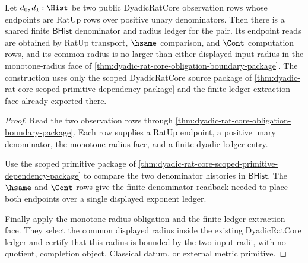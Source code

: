 \begin{theorem}
\label{thm:dyadic-common-exponent-radius-monotone}
Let $d_0,d_1:\Hist$ be two public DyadicRatCore observation rows whose
endpoints are RatUp rows over positive unary denominators. Then there is a
shared finite $\mathsf{BHist}$ denominator and radius ledger for the pair. Its
endpoint reads are obtained by RatUp transport, $\hsame$ comparison, and
$\Cont$ computation rows, and its common radius is no larger than either
displayed input radius in the monotone-radius face of
\autoref{thm:dyadic-rat-core-obligation-boundary-package}. The construction
uses only the scoped DyadicRatCore source package of
\autoref{thm:dyadic-rat-core-scoped-primitive-dependency-package} and the
finite-ledger extraction face already exported there.
\end{theorem}
\begin{proof}
Read the two observation rows through
\autoref{thm:dyadic-rat-core-obligation-boundary-package}. Each row supplies a
RatUp endpoint, a positive unary denominator, the monotone-radius face, and a
finite dyadic ledger entry.

Use the scoped primitive package of
\autoref{thm:dyadic-rat-core-scoped-primitive-dependency-package} to compare
the two denominator histories in $\mathsf{BHist}$. The $\hsame$ and $\Cont$
rows give the finite denominator readback needed to place both endpoints over a
single displayed exponent ledger.

Finally apply the monotone-radius obligation and the finite-ledger extraction
face. They select the common displayed radius inside the existing DyadicRatCore
ledger and certify that this radius is bounded by the two input radii, with no
quotient, completion object, Classical datum, or external metric primitive.
\end{proof}

